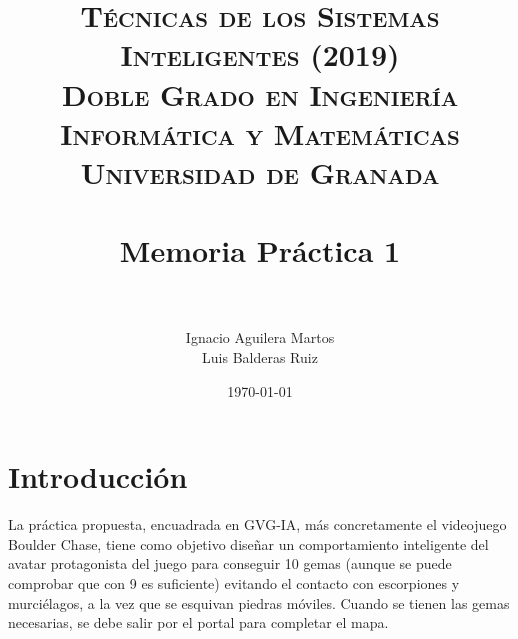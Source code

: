 
\graphicspath{ {./images/} }
\usepackage{subcaption}
\usepackage{hyperref}
\usepackage{soul}



\title{	
\normalfont \normalsize 
\textsc{\textbf{Técnicas de los Sistemas Inteligentes (2019)} \\ Doble Grado en Ingeniería Informática y Matemáticas \\ Universidad de Granada} \\ [25pt] %
\horrule{0.5pt} \\[0.4cm] %
\huge Memoria Práctica 1 \\ %
\horrule{2pt} \\[0.5cm] %
}

\author{Ignacio Aguilera Martos \\ Luis Balderas Ruiz} 


\date{\normalsize\today} %




\maketitle %

\newpage %

\tableofcontents %

\listoffigures

\newpage

\section{Introducción}

La práctica propuesta, encuadrada en GVG-IA, más concretamente el videojuego Boulder Chase, tiene como objetivo diseñar un comportamiento inteligente del avatar protagonista del juego para conseguir 10 gemas (aunque se puede comprobar que con 9 es suficiente) evitando el contacto con escorpiones y murciélagos, a la vez que se esquivan piedras móviles. Cuando se tienen las gemas necesarias, se debe salir por el portal para completar el mapa. \\

